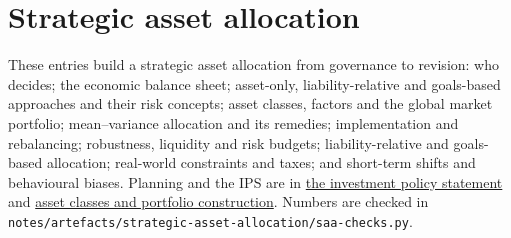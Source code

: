 \section{Strategic asset allocation}

These entries build a strategic asset allocation from governance to revision: who decides; the economic balance sheet; asset-only, liability-relative and goals-based approaches and their risk concepts; asset classes, factors and the global market portfolio; mean--variance allocation and its remedies; implementation and rebalancing; robustness, liquidity and risk budgets; liability-relative and goals-based allocation; real-world constraints and taxes; and short-term shifts and behavioural biases. Planning and the IPS are in \hyperref[meth:investment-policy-statement]{the investment policy statement} and \hyperref[meth:asset-class-portfolio-construction]{asset classes and portfolio construction}. Numbers are checked in \texttt{notes/artefacts/strategic-asset-allocation/saa-checks.py}.

